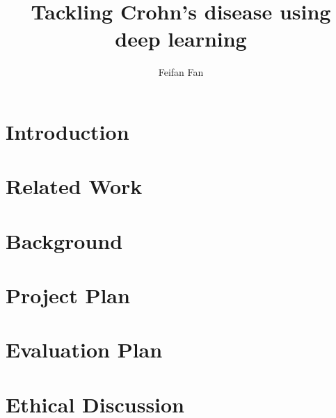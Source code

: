 \documentclass[a4paper,12pt,twoside]{report}
\begin{document}
\title{Tackling Crohn's disease using deep learning}
\author{Feifan Fan}


% 
% 

\tableofcontents

\chapter{Introduction}
\label{cha:introduction}


\chapter{Related Work}

\chapter{Background}
\label{cha:background}


\chapter{Project Plan}
\label{cha:project-plan}


\chapter{Evaluation Plan} %
\label{cha:evaluation-plan}

\chapter{Ethical Discussion}
\label{cha:ethical-discussion}


% 

% 

% 


\end{document}
